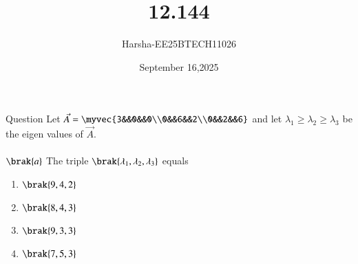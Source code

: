 \documentclass{beamer}
\title %
{12.144}
\date{September 16,2025}
\author %
{Harsha-EE25BTECH11026}
\begin{document}
\frame{\titlepage}


\begin{frame}{Question}
Let $\vec{A}=\myvec{3&&0&&0\\0&&6&&2\\0&&2&&6}$ and let $\lambda_1 \geq \lambda_2 \geq \lambda_3$ be the eigen values of $\vec{A}$.\\
\\
$\brak{a}$ The triple $\brak{\lambda_1,\lambda_2,\lambda_3}$ equals
\begin{enumerate}

    \item $\brak{9,4,2}$
    \item $\brak{8,4,3}$
    \item $\brak{9,3,3}$
    \item $\brak{7,5,3}$
\end{enumerate}
\end{frame}
\end{document}

